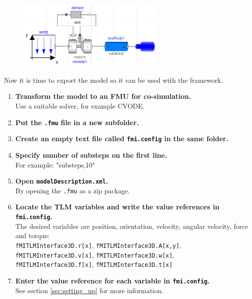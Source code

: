 \documentclass[11pt,a4paper,english]{report}
\begin{document}
\begin{figure}[ht]
\centering
\includegraphics[width=0.65\textwidth]{gfx/model_dymola.png}
\caption{}
\label{fig:model_dymola}
\end{figure}

Now it is time to export the model so it can be used with the framework.
\begin{enumerate}
\item \textbf{Transform the model to an FMU for co-simulation.}\\
      Use a suitable solver, for example CVODE.
\item \textbf{Put the \texttt{.fmu} file in a new subfolder.}
\item \textbf{Create an empty text file called \texttt{fmi.config} in the same folder.}
\item \textbf{Specify number of substeps on the first line.}\\
              For example: "substeps,10"
\item \textbf{Open \texttt{modelDescription.xml}.}\\
              By opening the \texttt{.fmu} as a zip package.
\item \textbf{Locate the TLM variables and write the value references in \texttt{fmi.config}.}\\
              The desired variables are position, orientation, velocity, angular velocity, force and torque:\\
              \texttt{fMITLMInterface3D.r[x]}, \texttt{fMITLMInterface3D.A[x,y]},\\
              \texttt{fMITLMInterface3D.v[x]}, \texttt{fMITLMInterface3D.w[x]},\\
              \texttt{fMITLMInterface3D.f[x]}, \texttt{fMITLMInterface3D.t[x]}
\item \textbf{Enter the value reference for each variable in \texttt{fmi.config}.}\\
              See section \cref{sec:setting_up} for more information.              
\end{enumerate}
\end{document}
